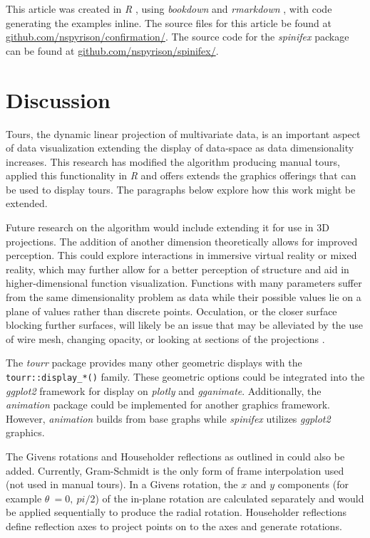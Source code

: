 \documentclass{monashthesis}
\begin{document}
This article was created in \emph{R} \autocite{r_core_team_r:_2018}, using \emph{bookdown} \autocite{xie_bookdown:_2016} and \emph{rmarkdown} \autocite{xie_r_2018}, with code generating the examples inline. The source files for this article be found at \href{https://github.com/nspyrison/confirmation/}{github.com/nspyrison/confirmation/}.
The source code for the \emph{spinifex} package can be found at \href{https://github.com/nspyrison/spinifex/}{github.com/nspyrison/spinifex/}.

\hypertarget{sec:discussion}{%
\section{Discussion}\label{sec:discussion}}

Tours, the dynamic linear projection of multivariate data, is an important aspect of data visualization extending the display of data-space as data dimensionality increases. This research has modified the algorithm producing manual tours, applied this functionality in \emph{R} and offers extends the graphics offerings that can be used to display tours. The paragraphs below explore how this work might be extended.

Future research on the algorithm would include extending it for use in 3D projections. The addition of another dimension theoretically allows for improved perception. This could explore interactions in immersive virtual reality or mixed reality, which may further allow for a better perception of structure and aid in higher-dimensional function visualization. Functions with many parameters suffer from the same dimensionality problem as data while their possible values lie on a plane of values rather than discrete points. Occulation, or the closer surface blocking further surfaces, will likely be an issue that may be alleviated by the use of wire mesh, changing opacity, or looking at sections of the projections \autocite{furnas_prosection_1994}.

The \emph{tourr} package provides many other geometric displays with the \texttt{tourr::display\_*()} family. These geometric options could be integrated into the \emph{ggplot2} framework for display on \emph{plotly} and \emph{gganimate}. Additionally, the \emph{animation} package \textcite{xie_animation:_2018} could be implemented for another graphics framework. However, \emph{animation} builds from base graphs while \emph{spinifex} utilizes \emph{ggplot2} graphics.

The Givens rotations and Householder reflections as outlined in \textcite{buja_computational_2005} could also be added. Currently, Gram-Schmidt is the only form of frame interpolation used (not used in manual tours). In a Givens rotation, the \(x\) and \(y\) components (for example \(\theta~= 0,~pi/2\)) of the in-plane rotation are calculated separately and would be applied sequentially to produce the radial rotation. Householder reflections define reflection axes to project points on to the axes and generate rotations.
\end{document}
